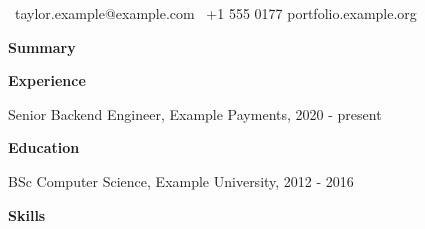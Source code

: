 \documentclass[10pt]{article}
\begin{document}
{\LARGE \Person}\par \faEnvelope\ taylor.example@example.com \quad \faPhone\ +1 555 0177 \quad portfolio.example.org\par\bigskip
\textbf{Summary}\par \Summary\par\medskip
\textbf{Experience}\par Senior Backend Engineer, Example Payments, 2020 - present\par
\JobA\par \JobB\par\medskip
\textbf{Education}\par BSc Computer Science, Example University, 2012 - 2016\par\medskip
\textbf{Skills}\par \SkillsLine\par
\end{document}
